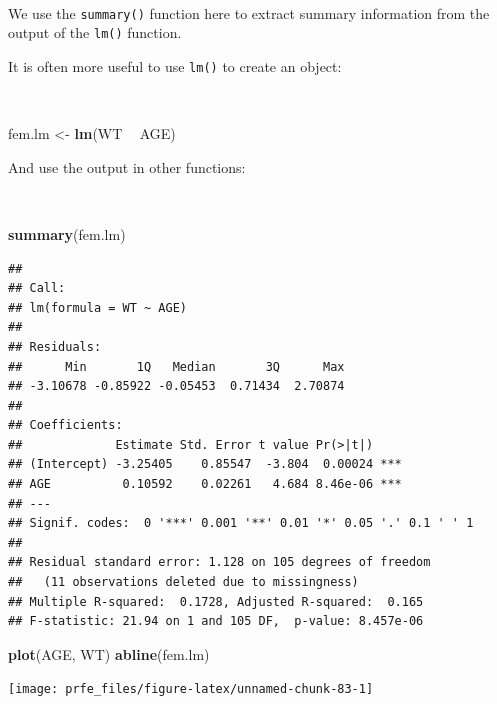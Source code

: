 \documentclass[12pt,a4paper]{book}
\newenvironment{Shaded}{\begin{snugshade}}{\end{snugshade}}
\newcommand{\KeywordTok}[1]{\textcolor[rgb]{0.13,0.29,0.53}{\textbf{#1}}}
\newcommand{\StringTok}[1]{\textcolor[rgb]{0.31,0.60,0.02}{#1}}
\newcommand{\OperatorTok}[1]{\textcolor[rgb]{0.81,0.36,0.00}{\textbf{#1}}}
\newcommand{\NormalTok}[1]{#1}
\theoremstyle{definition}
\theoremstyle{definition}
\theoremstyle{definition}
\theoremstyle{remark}
\begin{document}
~

We use the \texttt{summary()} function here to extract summary
information from the output of the \texttt{lm()} function.

It is often more useful to use \texttt{lm()} to create an object:

~

\begin{Shaded}
\begin{Highlighting}[]
\NormalTok{fem.lm <-}\StringTok{ }\KeywordTok{lm}\NormalTok{(WT }\OperatorTok{~}\StringTok{ }\NormalTok{AGE)}
\end{Highlighting}
\end{Shaded}

\newpage

And use the output in other functions:

~

\begin{Shaded}
\begin{Highlighting}[]
\KeywordTok{summary}\NormalTok{(fem.lm)}
\end{Highlighting}
\end{Shaded}

\begin{verbatim}
## 
## Call:
## lm(formula = WT ~ AGE)
## 
## Residuals:
##      Min       1Q   Median       3Q      Max 
## -3.10678 -0.85922 -0.05453  0.71434  2.70874 
## 
## Coefficients:
##             Estimate Std. Error t value Pr(>|t|)    
## (Intercept) -3.25405    0.85547  -3.804  0.00024 ***
## AGE          0.10592    0.02261   4.684 8.46e-06 ***
## ---
## Signif. codes:  0 '***' 0.001 '**' 0.01 '*' 0.05 '.' 0.1 ' ' 1
## 
## Residual standard error: 1.128 on 105 degrees of freedom
##   (11 observations deleted due to missingness)
## Multiple R-squared:  0.1728, Adjusted R-squared:  0.165 
## F-statistic: 21.94 on 1 and 105 DF,  p-value: 8.457e-06
\end{verbatim}

\newpage

\begin{Shaded}
\begin{Highlighting}[]
\KeywordTok{plot}\NormalTok{(AGE, WT)}
\KeywordTok{abline}\NormalTok{(fem.lm)}
\end{Highlighting}
\end{Shaded}

\begin{center}\texttt{[image: prfe\_files/figure-latex/unnamed-chunk-83-1]} \end{center}
\end{document}
